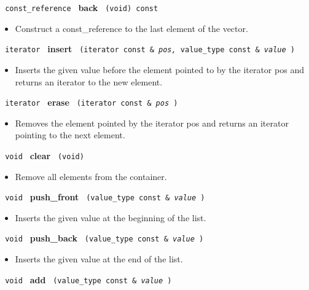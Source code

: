 \noindent
\texttt{%
const\_reference
}
\textbf{back}%
\texttt{%
(void) const
}

\begin{itemize}
\item
Construct a const\_reference to the last element of the vector.
\end{itemize}
 
 
\noindent
\texttt{%
iterator 	
}
\textbf{insert}%
\texttt{
(iterator const \&
\textit{pos,}%
value\_type const \&
\textit{value}%
)
}

\begin{itemize}
\item
Inserts the given value before the element pointed to by the iterator pos and returns an iterator to the new element.
\end{itemize}
 
\noindent
\texttt{%
iterator 	
}
\textbf{erase}%
\texttt{
(iterator const \&
\textit{pos}%
)
}
 	
\begin{itemize}
\item
Removes the element pointed by the iterator pos and returns an iterator pointing to the next element.
\end{itemize}
 
\noindent
\texttt{%
void 
}
\textbf{clear}%
\texttt{
(void)
}

\begin{itemize}
\item
Remove all elements from the container. 
\end{itemize}
 
\noindent
\texttt{%
void 	
}
\textbf{push\_front}%
\texttt{
(value\_type const \&
\textit{value}%
)
}

\begin{itemize}
\item
Inserts the given value at the beginning of the list.
\end{itemize}
 
\noindent
\texttt{%
void 	
}
\textbf{push\_back}%
\texttt{
(value\_type const \&
\textit{value}%
)
}

\begin{itemize}
\item
Inserts the given value at the end of the list.
\end{itemize}
 
\noindent
\texttt{%
void 	
}
\textbf{add}%
\texttt{
(value\_type const \&
\textit{value}%
)
}

